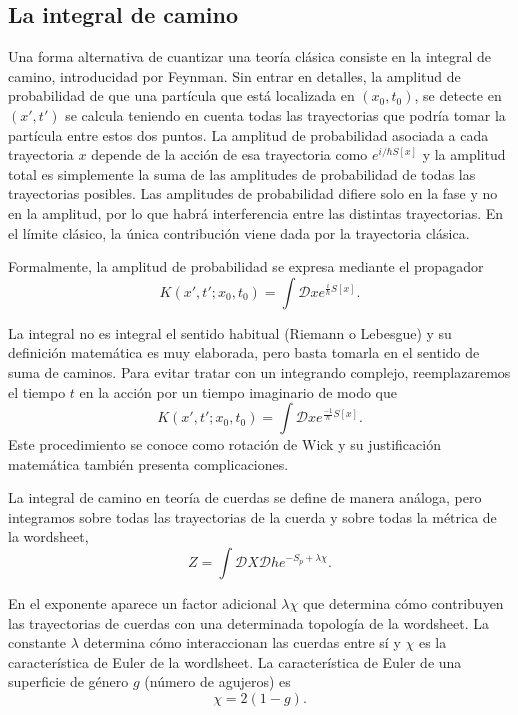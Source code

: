 
\subsection{La integral de camino}

Una forma alternativa de cuantizar una teoría clásica consiste en la integral de camino, 
introducidad por Feynman. 
Sin entrar en detalles, la amplitud de probabilidad de que una partícula que está localizada 
en $(x_0,t_0)$, se detecte en $(x',t')$ se calcula teniendo en cuenta todas las trayectorias
que podría tomar la partícula entre estos dos puntos.
La amplitud de probabilidad asociada a cada trayectoria $x$ depende de la acción de esa trayectoria
como $e^{i/\hbar S[x]}$ y la amplitud total es simplemente la suma de las amplitudes de probabilidad
de todas las trayectorias posibles.
Las amplitudes de probabilidad difiere solo en la fase y no en la amplitud, por lo que habrá 
interferencia entre las distintas trayectorias.
En el límite clásico, la única contribución viene dada por la trayectoria clásica.

Formalmente, la amplitud de probabilidad se expresa mediante el propagador
\begin{equation}
  K(x',t';x_0,t_0) = \int \mathcal Dx e^{\frac{i}{\hbar} S[x]}.
\end{equation}

La integral no es integral el sentido habitual (Riemann o Lebesgue) y su definición matemática
es muy elaborada, pero basta tomarla en el sentido de suma de caminos.
Para evitar tratar con un integrando complejo, reemplazaremos el tiempo $t$ en la acción por un tiempo imaginario de modo que
\begin{equation}
  K(x',t';x_0,t_0) = \int \mathcal Dx e^{\frac{-1}{\hbar} S[x]}.
\end{equation}
Este procedimiento se conoce como rotación de Wick y su justificación matemática también presenta complicaciones.


La integral de camino en teoría de cuerdas se define de manera análoga, pero integramos 
sobre todas las trayectorias de la cuerda y sobre todas la métrica de la wordsheet,
\begin{equation}
  Z = \int \mathcal DX \mathcal Dh e^{-S_p+\lambda \chi}.
\end{equation}

En el exponente aparece un factor adicional $\lambda\chi$ que determina cómo contribuyen las trayectorias
de cuerdas con una determinada topología de la wordsheet.
La constante $\lambda$ determina cómo interaccionan las cuerdas entre sí y $\chi$ es la característica
de Euler de la wordlsheet.
La característica de Euler de una superficie de género $g$ (número de agujeros) es
\begin{equation}
  \chi = 2(1-g).
\end{equation}

